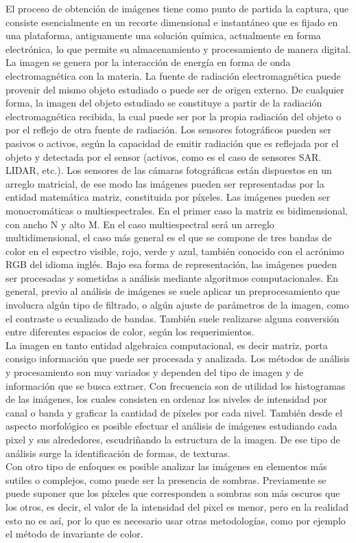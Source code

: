 El proceso de obtención de imágenes tiene como punto de partida la captura, que consiste esencialmente en un recorte dimensional e instantáneo que es fijado en una plataforma, antiguamente una solución química, actualmente en forma electrónica, lo que permite su almacenamiento y procesamiento de manera digital. La imagen se genera por la interacción de energía en forma de onda electromagnética con la materia. La fuente de radiación electromagnética puede provenir del mismo objeto estudiado o puede ser de origen externo. De cualquier forma, la imagen del objeto estudiado se constituye a partir de la radiación electromagnética recibida, la cual puede ser por la propia radiación del objeto o por el reflejo de otra fuente de radiación. Los sensores fotográficos pueden ser pasivos o activos, según la capacidad de emitir radiación que es reflejada por el objeto y detectada por el sensor (activos, como es el caso de sensores SAR. LIDAR, etc.). Los sensores de las cámaras fotográficas están dispuestos en un arreglo matricial, de ese modo las imágenes pueden ser representadas por la entidad matemática matriz, constituida por píxeles. Las imágenes pueden ser monocromáticas o multiespectrales. En el primer caso la matriz es bidimensional, con ancho N y alto M. En el caso multiespectral será un arreglo multidimensional, el caso más general es el que se compone de tres bandas de color en el espectro visible, rojo, verde y azul, también conocido con el acrónimo RGB del idioma inglés. Bajo esa forma de representación, las imágenes pueden ser procesadas y sometidas a análisis mediante algoritmos computacionales. En general, previo al análisis de imágenes se suele aplicar un preprocesamiento que involucra algún tipo de filtrado, o algún ajuste de parámetros de la imagen, como el contraste o ecualizado de bandas. También suele realizarse alguna conversión entre diferentes espacios de color, según los requerimientos.\\
La imagen en tanto entidad algebraica computacional, es decir matriz, porta consigo información que puede ser procesada y analizada. Los métodos de análisis y procesamiento son muy variados y dependen del tipo de imagen y de información que se busca extraer. Con frecuencia son de utilidad los histogramas de las imágenes, los cuales consisten en ordenar los niveles de intensidad por canal o banda y graficar la cantidad de píxeles por cada nivel. También desde el aspecto morfológico es posible efectuar el análisis de imágenes estudiando cada pixel y sus alrededores, escudriñando la estructura de la imagen. De ese tipo de análisis surge la identificación de formas, de texturas.\\
Con otro tipo de enfoques es posible analizar las imágenes en elementos más sutiles o complejos, como puede ser la presencia de sombras. Previamente se puede suponer que los píxeles que corresponden a sombras son más oscuros que los otros, es decir, el valor de la intensidad del pixel es menor, pero en la realidad esto no es así, por lo que es necesario usar otras metodologías, como por ejemplo el método de invariante de color.
